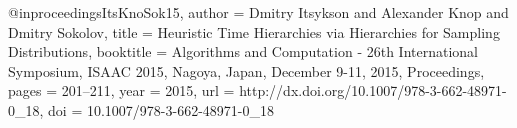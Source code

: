 @inproceedings{ItsKnoSok15,
  author    = {Dmitry Itsykson and
               Alexander Knop and
               Dmitry Sokolov},
  title     = {Heuristic Time Hierarchies via Hierarchies for Sampling Distributions},
  booktitle = {Algorithms and Computation - 26th International Symposium, {ISAAC}
               2015, Nagoya, Japan, December 9-11, 2015, Proceedings},
  pages     = {201--211},
  year      = {2015},
  url       = {http://dx.doi.org/10.1007/978-3-662-48971-0_18},
  doi       = {10.1007/978-3-662-48971-0_18}
}
